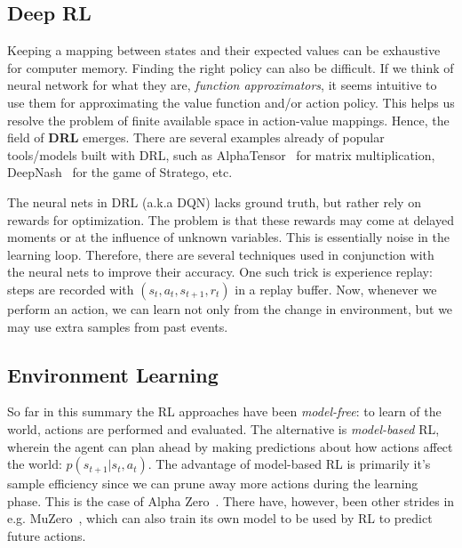 \documentclass[10pt,twocolumn,letterpaper]{article}
\begin{document}

\subsection{Deep RL}
Keeping a mapping between states and their expected values can be exhaustive for computer memory. Finding the right policy can also be difficult. If we think of neural network for what they are, \textit{function approximators}, it seems intuitive to use them for approximating the value function and/or action policy. This helps us resolve the problem of finite available space in action-value mappings. Hence, the field of \textbf{\gls{DRL}} emerges. There are several examples already of popular tools/models built with \gls{DRL}, such as AlphaTensor~\cite{alphaTensor} for matrix multiplication, DeepNash~\cite{stratego} for the game of Stratego, etc. 

The neural nets in \gls{DRL} (a.k.a \gls{DQN}) lacks ground truth, but rather rely on rewards for optimization. The problem is that these rewards may come at delayed moments or at the influence of unknown variables. This is essentially noise in the learning loop. Therefore, there are several techniques used in conjunction with the neural nets to improve their accuracy. One such trick is experience replay: steps are recorded with $(s_{t}, a_{t}, s_{t+1}, r_{t})$ in a replay buffer. Now, whenever we perform an action, we can learn not only from the change in environment, but we may use extra samples from past events.


\subsection{Environment Learning}
So far in this summary the \gls{RL} approaches have been \textit{model-free}: to learn of the world, actions are performed and evaluated. The alternative is \textit{model-based} \gls{RL}, wherein the agent can plan ahead by making predictions about how actions affect the world: $p(s_{t+1} \vert{} s_{t}, a_{t})$. The advantage of model-based \gls{RL} is primarily it's sample efficiency since we can prune away more actions during the learning phase. This is the case of Alpha Zero~\cite{alphaZero}. There have, however, been other strides in e.g. MuZero~\cite{muZero}, which can also train its own model to be used by \gls{RL} to predict future actions.
\end{document}
